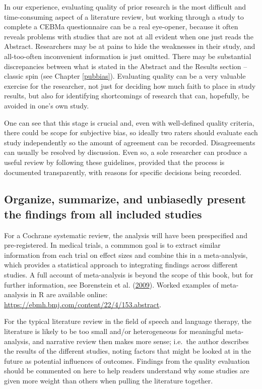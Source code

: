\documentclass{krantz}
\begin{document}
In our experience, evaluating quality of prior research is the most difficult and time-consuming aspect of a literature review, but working through a study to complete a CEBMa questionnaire can be a real eye-opener, because it often reveals problems with studies that are not at all evident when one just reads the Abstract. Researchers may be at pains to hide the weaknesses in their study, and all-too-often inconvenient information is just omitted. There may be substantial discrepancies between what is stated in the Abstract and the Results section -- classic spin (see Chapter \ref{pubbias}). Evaluating quality can be a very valuable exercise for the researcher, not just for deciding how much faith to place in study results, but also for identifying shortcomings of research that can, hopefully, be avoided in one's own study.

One can see that this stage is crucial and, even with well-defined quality criteria, there could be scope for subjective bias, so ideally two raters should evaluate each study independently so the amount of agreement can be recorded. Disagreements can usually be resolved by discussion. Even so, a sole researcher can produce a useful review by following these guidelines, provided that the process is documented transparently, with reasons for specific decisions being recorded.

\hypertarget{organize-summarize-and-unbiasedly-present-the-findings-from-all-included-studies}{%
\subsection{Organize, summarize, and unbiasedly present the findings from all included studies}\label{organize-summarize-and-unbiasedly-present-the-findings-from-all-included-studies}}

For a Cochrane systematic review, the analysis will have been prespecified and pre-registered. In medical trials, a commmon goal is to extract similar information from each trial on effect sizes and combine this in a meta-analysis, which provides a statistical approach to integrating findings across different studies. A full account of meta-analysis is beyond the scope of this book, but for further information, see Borenstein et al. (\protect\hyperlink{ref-borenstein2009}{2009}). Worked examples of meta-analysis in R are available online: \url{https://ebmh.bmj.com/content/22/4/153.abstract}.

For the typical literature review in the field of speech and language therapy, the literature is likely to be too small and/or heterogeneous for meaningful meta-analysis, and narrative review then makes more sense; i.e.~the author describes the results of the different studies, noting factors that might be looked at in the future as potential influences of outcomes. Findings from the quality evaluation should be commented on here to help readers understand why some studies are given more weight than others when pulling the literature together.
\end{document}
